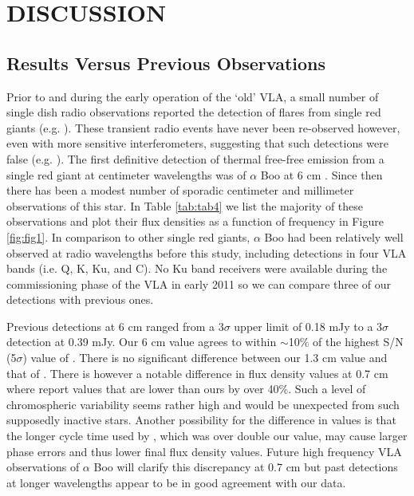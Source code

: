 \documentclass[iop]{emulateapj}
\begin{document}
\section{DISCUSSION}
\subsection{Results Versus Previous Observations} \label{disc1}
Prior to and during the early operation of the `old' VLA, a small number of single dish radio observations reported the detection of flares from single red giants (e.g. \citealt{1981ApJ...245L..71B}). These transient radio events have never been re-observed however, even with more sensitive interferometers, suggesting that such detections were false (e.g. \citealt{1992MNRAS.254....1B}). The first definitive detection of thermal free-free emission from a single red giant at centimeter wavelengths was of $\alpha$ Boo at 6 cm \citep{1983ApJ...274L..77D,1986AJ.....91..602D}. Since then there has been a modest number of sporadic centimeter and millimeter observations of this star. In Table \ref{tab:tab4} we list the majority of these observations and plot their flux densities as a function of frequency in Figure \ref{fig:fig1}. In comparison to other single red giants, $\alpha$ Boo had been relatively well observed at radio wavelengths before this study, including detections in four VLA bands (i.e. Q, K, Ku, and C). No Ku band receivers were available during the commissioning phase of the VLA in early 2011 so we can compare three of our detections with previous ones. 

Previous detections at 6 cm ranged from a 3$\sigma$ upper limit of 0.18 mJy to a 3$\sigma$ detection at 0.39 mJy. Our 6 cm value agrees to within $\sim$10$\%$ of the highest S/N (5$\sigma$) value of \cite{1986AJ.....91..602D}. There is no significant difference between our 1.3 cm value and that of \cite{2011AA...533A.107D}.
There is however a notable difference in flux density values at 0.7 cm  where \cite{2011AA...533A.107D} report values that are lower than ours by over 40\%. Such a level of chromospheric variability seems rather high and would be unexpected from such supposedly inactive stars. Another possibility for the difference in values is that the longer cycle time used by \cite{2011AA...533A.107D}, which was over double our value, may cause larger phase errors and thus lower final flux density values. Future high frequency VLA observations of $\alpha$ Boo will clarify this discrepancy at 0.7 cm but past detections at longer wavelengths appear to be in good agreement with our data.
\end{document}

